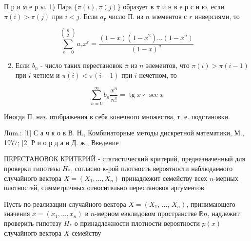 \documentclass[10pt]{article}
\begin{document}
П р и м е р ы. 1) Пара $\{\pi(i), \pi(j)\}$ образует в $\bar{\pi}$ и н в е р с и ю, если $\pi(i)>\pi(j)$ при $i<j$. Если $a_{\boldsymbol{r}}$ число П. из $n$ элементов с $r$ инверсиями, то



\[

\sum_{r=0}^{\left(\begin{array}{l}

n \\

2

\end{array}\right)} a_{r} x^{r}=\frac{(1-x)\left(1-x^{2}\right) \ldots\left(1-x^{n}\right)}{(1-x)^{n}}

\]



\begin{enumerate}

  \setcounter{enumi}{1}

  \item Если $b_{n}$ - число таких перестановок $\bar{\pi}$ из $n$ элементов, что $\pi(i)>\pi(i-1)$ при $i$ четном и $\pi(i)<\pi(i-1)$ при $i$ нечетном, то

\end{enumerate}



\[

\sum_{n=0}^{\infty} b_{n} \frac{x^{n}}{n !}=\operatorname{tg} x \nmid \sec x

\]



Иногда П. наз. отображения в себя конечного множества, т. е. подстановки.



Лum.: [1] С а ч к о в В. Н., Комбинаторные методы дискретной математики, М., 1977; [2] Р и о р д а н Д. ж., Введение



ПЕРЕСТАНОВОК КРИТЕРИЙ - статистический критерий, предназначенный для проверки гипотезы $H_{*}$, согласно к-рой плотность вероятности наблюдаемого случайного вектора $X=\left(X_{1}, \ldots, X_{n}\right)$ принадлежит семейству всех $n$-мерных плотностей, симметричных относительно перестановок аргументов.



Пусть по реализации случайного вектора $X=\left(X_{1}\right.$, ..., $\left.X_{n}\right)$, принимающего значения $x=\left(x_{1}, \ldots, x_{n}\right)$ в $n$-мерном евклидовом пространстве $\mathbb{R} n$, надлежит проверить гипотезу $H_{*}$ о принадлежности плотности вероятности $p(x)$ случайного вектора $X$ семейству
\end{document}
